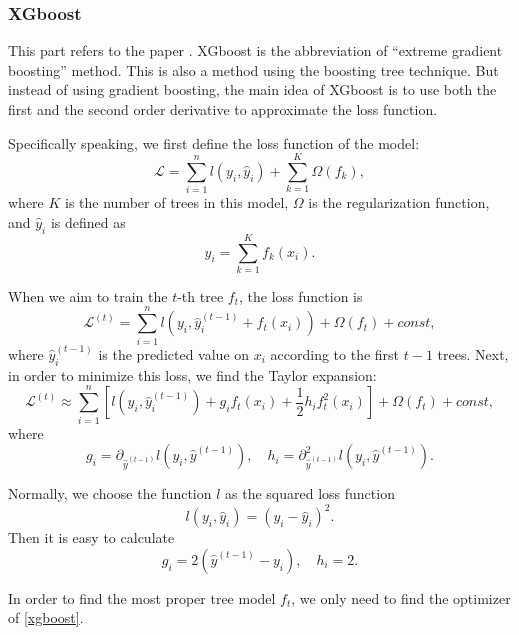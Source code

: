 \documentclass[english]{article}
\begin{document}
\subsubsection{XGboost}
\par This part refers to the paper \cite{chen1603xgboost}. XGboost is the abbreviation of ``extreme gradient boosting'' method. This is also a method using the boosting tree technique. But instead of using gradient boosting, the main idea of XGboost is to use both the first and the second order derivative to approximate the loss function.
\par Specifically speaking, we first define the loss function of the model:
\begin{equation}
	\mathcal{L} = \sum_{i=1}^{n}l(y_{i}, \hat{y}_{i}) + \sum_{k=1}^{K}\Omega(f_{k}),
\end{equation}
where $K$ is the number of trees in this model, $\Omega$ is the regularization function, and $\hat{y}_{i}$ is defined as
\begin{equation}
	\hat{y}_{i} = \sum_{k=1}^{K}f_{k}(x_{i}).
\end{equation}
\par When we aim to train the $t$-th tree $f_{t}$, the loss function is 
\begin{equation}
	\mathcal{L}^{(t)} = \sum_{i=1}^{n}l(y_{i}, \hat{y}_{i}^{(t-1)} + f_{t}(x_{i})) + \Omega(f_{t}) + const,
\end{equation}
where $\hat{y}_{i}^{(t-1)}$ is the predicted value on $x_{i}$ according to the first $t-1$ trees. Next, in order to minimize this loss, we find the Taylor expansion:
\begin{equation}\label{xgboost}
	\mathcal{L}^{(t)}\approx\sum_{i=1}^{n}\left[l(y_{i}, \hat{y}_{i}^{(t-1)}) + g_{i}f_{t}(x_{i}) + \frac{1}{2}h_{i}f_{t}^{2}(x_{i})\right] + \Omega(f_{t}) + const,
\end{equation}
where
\begin{equation}
	g_{i} = \partial_{\hat{y}^{(t-1)}}l(y_{i}, \hat{y}^{(t-1)}), \quad h_{i} = \partial^{2}_{\hat{y}^{(t-1)}}l(y_{i}, \hat{y}^{(t-1)}).
\end{equation}
\par Normally, we choose the function $l$ as the squared loss function
\begin{equation}
	l(y_{i}, \hat{y}_{i}) = (y_{i} - \hat{y}_{i})^{2}.
\end{equation}
Then it is easy to calculate 
\begin{equation}
	g_{i} = 2(\hat{y}^{(t-1)} - y_{i}), \quad h_{i} = 2.
\end{equation}
\par In order to find the most proper tree model $f_{t}$, we only need to find the optimizer of \eqref{xgboost}.
\end{document}
